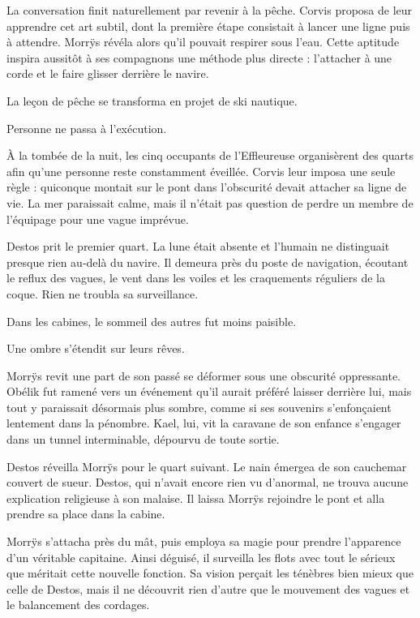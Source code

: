 La conversation finit naturellement par revenir à la pêche. Corvis proposa de leur apprendre cet art subtil, dont la première étape consistait à lancer une ligne puis à attendre. Morrÿs révéla alors qu'il pouvait respirer sous l'eau. Cette aptitude inspira aussitôt à ses compagnons une méthode plus directe : l'attacher à une corde et le faire glisser derrière le navire.

La leçon de pêche se transforma en projet de ski nautique.

Personne ne passa à l'exécution.

\scenebreak

À la tombée de la nuit, les cinq occupants de l'Effleureuse organisèrent des quarts afin qu'une personne reste constamment éveillée. Corvis leur imposa une seule règle : quiconque montait sur le pont dans l'obscurité devait attacher sa ligne de vie. La mer paraissait calme, mais il n'était pas question de perdre un membre de l'équipage pour une vague imprévue.

Destos prit le premier quart. La lune était absente et l'humain ne distinguait presque rien au-delà du navire. Il demeura près du poste de navigation, écoutant le reflux des vagues, le vent dans les voiles et les craquements réguliers de la coque. Rien ne troubla sa surveillance.

Dans les cabines, le sommeil des autres fut moins paisible.

Une ombre s'étendit sur leurs rêves.

Morrÿs revit une part de son passé se déformer sous une obscurité oppressante. Obélik fut ramené vers un événement qu'il aurait préféré laisser derrière lui, mais tout y paraissait désormais plus sombre, comme si ses souvenirs s'enfonçaient lentement dans la pénombre. Kael, lui, vit la caravane de son enfance s'engager dans un tunnel interminable, dépourvu de toute sortie.

\scenebreak

Destos réveilla Morrÿs pour le quart suivant. Le nain émergea de son cauchemar couvert de sueur. Destos, qui n'avait encore rien vu d'anormal, ne trouva aucune explication religieuse à son malaise. Il laissa Morrÿs rejoindre le pont et alla prendre sa place dans la cabine.

Morrÿs s'attacha près du mât, puis employa sa magie pour prendre l'apparence d'un véritable capitaine. Ainsi déguisé, il surveilla les flots avec tout le sérieux que méritait cette nouvelle fonction. Sa vision perçait les ténèbres bien mieux que celle de Destos, mais il ne découvrit rien d'autre que le mouvement des vagues et le balancement des cordages.

